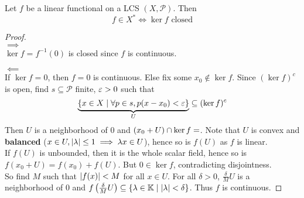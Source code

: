 \documentclass{article}
\begin{document}
\begin{nlemma}\label{lem:lcs-dual}
  Let $f$ be a linear functional on a LCS $(X, \mathcal P)$. Then
  $$f \in X^* \iff \ker f \text{ closed}$$
\end{nlemma}
\begin{proof}~\\
  $\implies$ \\
  $\ker f = f^{-1}(0)$ is closed since $f$ is continuous.
  
  $\impliedby$ \\
  If $\ker f = 0$, then $f = 0$ is continuous. Else fix some $x_0 \nin \ker f$. Since $(\ker f)^c$ is open, find $s \subseteq \mathcal P$ finite, $\varepsilon > 0$ such that
  $$\underbrace{\{x \in X \mid \forall p \in s, p(x - x_0) < \varepsilon\}}_U \subseteq (\ker f)^c$$
  Then $U$ is a neighborhood of $0$ and $(x_0 + U) \cap \ker f = \empty$. Note that $U$ is convex and {\bf balanced} ($x \in U, \left\lvert \lambda\right\rvert \le 1 \implies \lambda x \in U$), hence so is $f(U)$ as $f$ is linear. \\
  If $f(U)$ is unbounded, then it is the whole scalar field, hence so is $f(x_0 + U) = f(x_0) + f(U)$. But $0 \in \ker f$, contradicting disjointness. \\
  So find $M$ such that $\left\lvert f(x)\right\rvert < M$ for all $x \in U$. For all $\delta > 0$, $\frac\delta M U$ is a neighborhood of $0$ and $f\left(\frac\delta M U\right) \subseteq \{\lambda \in \mathbb K \mid \left\lvert \lambda\right\rvert < \delta\}$. Thus $f$ is continuous.
\end{proof}
\end{document}

